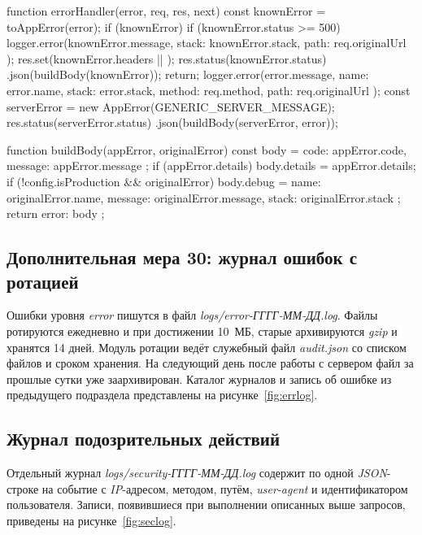 \documentclass{stp}
\begin{document}
\begin{stplisting}
function errorHandler(error, req, res, next) {
  const knownError = toAppError(error);
  if (knownError) {
    if (knownError.status >= 500) {
      logger.error(knownError.message,
        { stack: knownError.stack, path: req.originalUrl });
    }
    res.set(knownError.headers || {});
    res.status(knownError.status)
      .json(buildBody(knownError));
    return;
  }
  logger.error(error.message, { name: error.name,
    stack: error.stack, method: req.method,
    path: req.originalUrl });
  const serverError = new AppError(GENERIC_SERVER_MESSAGE);
  res.status(serverError.status)
    .json(buildBody(serverError, error));
}

function buildBody(appError, originalError) {
  const body = { code: appError.code,
    message: appError.message };
  if (appError.details) {
    body.details = appError.details;
  }
  if (!config.isProduction && originalError) {
    body.debug = { name: originalError.name,
      message: originalError.message,
      stack: originalError.stack };
  }
  return { error: body };
}
\end{stplisting}

\subsection{Дополнительная мера 30: журнал ошибок с ротацией}

Ошибки уровня \textit{error} пишутся в файл \textit{logs/error-ГГГГ-ММ-ДД.log}. Файлы
ротируются ежедневно и при достижении 10~МБ, старые архивируются \textit{gzip} и
хранятся 14 дней. Модуль ротации ведёт служебный файл \textit{audit.json} со
списком файлов и сроком хранения. На следующий день после работы с
сервером файл за прошлые сутки уже заархивирован. Каталог журналов и
запись об ошибке из предыдущего подраздела представлены на рисунке~\ref{fig:errlog}.


\subsection{Журнал подозрительных действий}

Отдельный журнал \textit{logs/security-ГГГГ-ММ-ДД.log} содержит по одной
\textit{JSON}-строке на событие с \textit{IP}-адресом, методом, путём, \textit{user-agent} и
идентификатором пользователя. Записи, появившиеся при выполнении
описанных выше запросов, приведены на рисунке~\ref{fig:seclog}.
\end{document}
